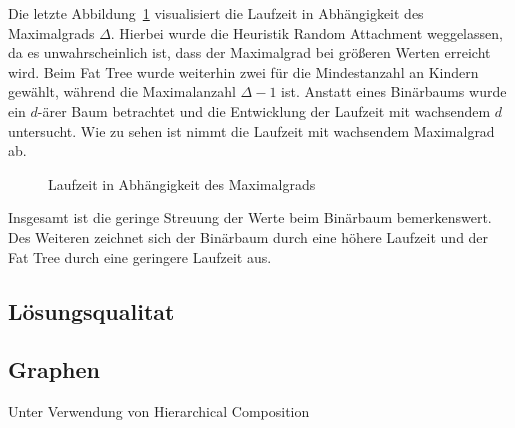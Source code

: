 Die letzte Abbildung~\ref{fig:rundeg} visualisiert die Laufzeit in Abhängigkeit des Maximalgrads $\Delta$.
Hierbei wurde die Heuristik Random Attachment weggelassen, da es unwahrscheinlich ist, dass der Maximalgrad bei größeren Werten erreicht wird.
Beim Fat Tree wurde weiterhin zwei für die Mindestanzahl an Kindern gewählt, während die Maximalanzahl $\Delta - 1$ ist.
Anstatt eines Binärbaums wurde ein $d$\hyp ärer Baum betrachtet und die Entwicklung der Laufzeit mit wachsendem $d$ untersucht.
Wie zu sehen ist nimmt die Laufzeit mit wachsendem Maximalgrad ab.
\begin{figure}
    \centering
    \scalebox{0.8}{}
    \caption{Laufzeit in Abhängigkeit des Maximalgrads}\label{fig:rundeg}
\end{figure}

Insgesamt ist die geringe Streuung der Werte beim Binärbaum bemerkenswert.
Des Weiteren zeichnet sich der Binärbaum durch eine höhere Laufzeit und der Fat Tree durch eine geringere Laufzeit aus.

\subsection{Lösungsqualitat}

\begin{figure}
    \centering
    \scalebox{0.8}{}
    \scalebox{0.8}{}
    \scalebox{0.8}{}
    \scalebox{0.8}{}
\end{figure}
\subsection{Graphen}
Unter Verwendung von Hierarchical Composition

